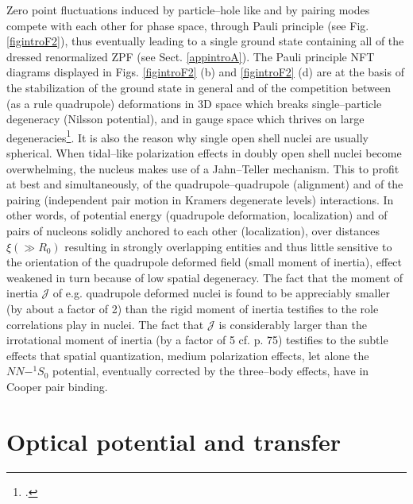 Zero point fluctuations induced by particle--hole like and by pairing modes compete with each other for phase space, through Pauli principle (see Fig. \ref{figintroF2}), thus eventually leading to a single ground state containing all of the dressed renormalized ZPF (see Sect. \ref{appintroA}). The Pauli principle NFT diagrams displayed in Figs. \ref{figintroF2} (b) and \ref{figintroF2} (d) are at the basis of the stabilization of the ground state in general and of the competition between (as a rule quadrupole) deformations in 3D space which breaks single--particle degeneracy (Nilsson potential), and in gauge space which thrives on large degeneracies\footnote{\cite{Bayman:61,Bes:69,Mottelson:62,Bohr:75}.}. It is also the reason why single open shell nuclei are usually spherical. When tidal--like polarization effects in doubly open shell nuclei become overwhelming, the nucleus makes use of a Jahn--Teller mechanism. This to profit at best and simultaneously, of the quadrupole--quadrupole (alignment) and of the pairing (independent pair motion in Kramers degenerate levels) interactions. In other words, of potential energy (quadrupole deformation, localization) and of pairs of nucleons solidly anchored to each other (localization), over distances $\xi (\gg R_0)$ resulting in strongly overlapping entities and thus little sensitive to the orientation of the quadrupole deformed field (small moment of inertia), effect weakened in turn because of low spatial degeneracy. The fact that the moment of inertia $\mathcal J$ of e.g. quadrupole deformed nuclei is found to be appreciably smaller (by about a factor of 2) than the rigid moment of inertia testifies to the role correlations play in nuclei. The fact that $\mathcal J$ is considerably larger than the irrotational moment of inertia (by a factor of 5 cf. \cite{Bohr:75} p. 75) testifies to the subtle effects that spatial quantization, medium polarization effects, let alone the $NN-^1S_0$ potential, eventually corrected by the three--body effects, have in Cooper pair binding.
\newpage

\section{Optical potential and transfer}\label{C1S9}
